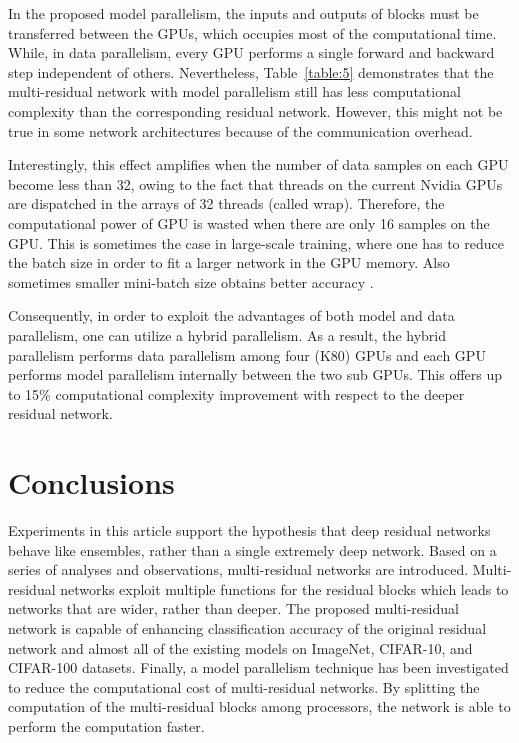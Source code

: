\documentclass[journal]{IEEEtran}
\begin{document}
In the proposed model parallelism, the inputs and outputs of blocks must be  transferred between the GPUs, which occupies most of the computational time. While, in data parallelism, every GPU performs a single forward and backward step independent of others. Nevertheless, Table~\ref{table:5} demonstrates that the multi-residual network with model parallelism still has less computational complexity than the corresponding residual network. However, this might not be true in some network architectures because of the communication overhead.

Interestingly, this effect amplifies when the number of data samples on each GPU  become less than 32, owing to the fact that threads on the current Nvidia GPUs are dispatched in the arrays of 32 threads (called wrap). Therefore, the computational power of GPU is wasted when there are only 16 samples on the GPU. This is sometimes the case in large-scale training, where one has to reduce the batch size in order to fit a larger network in the GPU memory. Also sometimes smaller mini-batch size obtains better accuracy \cite{he2016identity}.

Consequently, in order to exploit the advantages of both model and data parallelism, one can utilize a hybrid parallelism. As a result, the hybrid parallelism performs data parallelism among four (K80) GPUs and each  GPU performs model parallelism internally between the two sub GPUs. This offers up to 15\% computational complexity improvement with respect to the deeper residual network.%





\section{Conclusions}\label{sec6}

Experiments in this article support the hypothesis that deep residual networks behave like ensembles, rather than a single extremely deep network. Based on a series of analyses and observations, multi-residual networks are introduced. Multi-residual networks exploit multiple functions for the residual blocks which leads to networks that are wider, rather than deeper. The proposed multi-residual network is capable of enhancing classification accuracy of the original residual network and almost all of the existing models on ImageNet, CIFAR-10, and CIFAR-100 datasets. Finally, a model parallelism technique has been investigated to reduce the computational cost of multi-residual networks. By splitting the computation of the multi-residual blocks among processors, the network is able to perform the computation faster.
\end{document}
